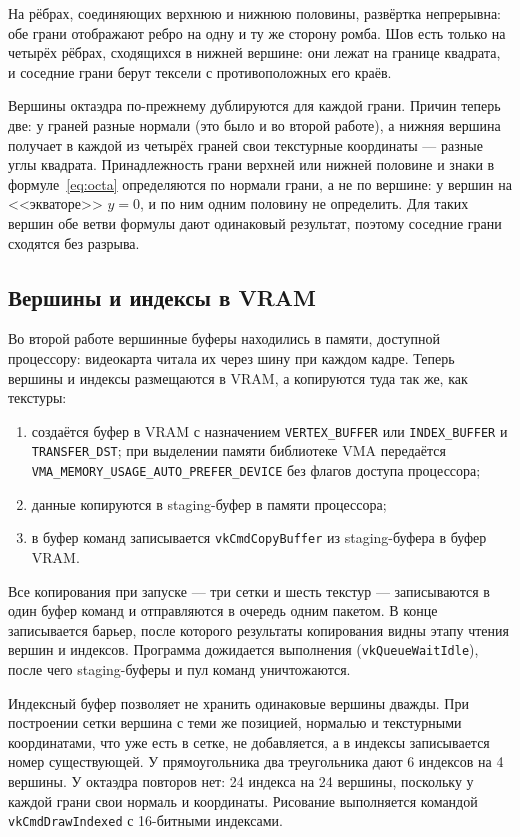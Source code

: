 \documentclass[14pt,a4paper]{extarticle}
\begin{document}
На рёбрах, соединяющих верхнюю и нижнюю половины, развёртка непрерывна: обе
грани отображают ребро на одну и ту же сторону ромба. Шов есть только на
четырёх рёбрах, сходящихся в нижней вершине: они лежат на границе квадрата,
и соседние грани берут тексели с противоположных его краёв.

Вершины октаэдра по-прежнему дублируются для каждой грани. Причин теперь две:
у граней разные нормали (это было и во второй работе), а нижняя вершина
получает в каждой из четырёх граней свои текстурные координаты — разные
углы квадрата. Принадлежность грани верхней или нижней половине и знаки в
формуле~\eqref{eq:octa} определяются по нормали грани, а не по вершине:
у вершин на <<экваторе>> $y = 0$, и по ним одним половину не определить. Для
таких вершин обе ветви формулы дают одинаковый результат, поэтому соседние
грани сходятся без разрыва.

\subsection{Вершины и индексы в VRAM}

Во второй работе вершинные буферы находились в памяти, доступной процессору:
видеокарта читала их через шину при каждом кадре. Теперь вершины и индексы
размещаются в VRAM, а копируются туда так же, как текстуры:

\begin{enumerate}[nosep, leftmargin=*]
	\item создаётся буфер в VRAM с назначением \texttt{VERTEX\_BUFFER} или
	\texttt{INDEX\_BUFFER} и \texttt{TRANSFER\_DST}; при выделении памяти
	библиотеке VMA передаётся \texttt{VMA\_MEMORY\_USAGE\_\allowbreak AUTO\_PREFER\_DEVICE}
	без флагов доступа процессора;
	\item данные копируются в staging-буфер в памяти процессора;
	\item в буфер команд записывается \texttt{vkCmdCopyBuffer} из
	staging-буфера в буфер VRAM.
\end{enumerate}

Все копирования при запуске — три сетки и шесть текстур — записываются в один
буфер команд и отправляются в очередь одним пакетом. В конце записывается
барьер, после которого результаты копирования видны этапу чтения вершин и
индексов. Программа дожидается выполнения (\texttt{vkQueueWaitIdle}), после
чего staging-буферы и пул команд уничтожаются.

Индексный буфер позволяет не хранить одинаковые вершины дважды. При
построении сетки вершина с теми же позицией, нормалью и текстурными
координатами, что уже есть в сетке, не добавляется, а в индексы записывается
номер существующей. У прямоугольника два треугольника дают 6 индексов на 4
вершины. У октаэдра повторов нет: 24 индекса на 24 вершины, поскольку у
каждой грани свои нормаль и координаты. Рисование выполняется командой
\texttt{vkCmdDrawIndexed} с 16-битными индексами.
\end{document}
